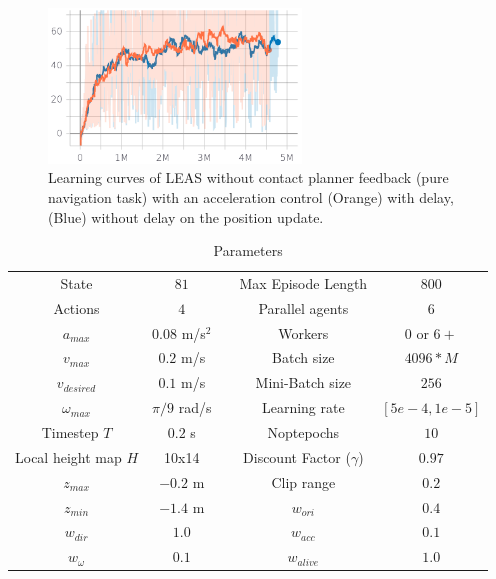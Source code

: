 \begin{figure}
    \centering
    \includegraphics[width=0.6\textwidth]{Figures/Chapter_LEAS/learning_curves_P1.png}
    \caption{Learning curves of LEAS without contact planner feedback (pure navigation task) with an acceleration control (Orange) with delay, (Blue) without delay on the position update.}
    \label{fig:control_LEAS_learning_curves}
\end{figure}

\begin{table}[tb]
\begin{center}
\caption{Parameters}
\begin{tabular}{|c|c| c |c|c|}
 State & $81$ && Max Episode Length & $800$\\
 Actions & $4$ && Parallel agents & $6$\\
 $a_{max}$ & $0.08$ m/s$^2$ && Workers & $0$ \: or \: $6+$ \\
 $v_{max}$ & $0.2$ m/s && Batch size & $4096*M$\\
 $v_{desired}$ & $0.1$ m/s && Mini-Batch size & $256$\\
 $\omega_{max}$ & $\pi/9$ rad/s && Learning rate & $[5e-4,1e-5]$\\
 Timestep $T$ & $0.2$ s && Noptepochs & $10$\\
 Local height map $H$ & 10x14 && Discount Factor ($\gamma$) & $0.97$\\
 $z_{max}$ & $-0.2$ m  && Clip range & $0.2$\\
 $z_{min}$ & $-1.4$ m &&
 $w_{ori}$ & $0.4$ \\
 $w_{dir}$ & $1.0$  &&
 $w_{acc}$ & $0.1$ \\
 $w_{\omega}$ & $0.1$  &&
 $w_{alive}$ & $1.0$
\end{tabular}
\label{tab:param}
\end{center}
\end{table}

